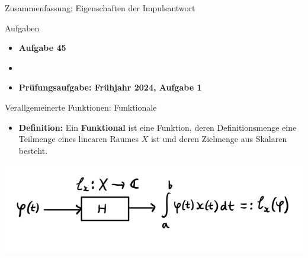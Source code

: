 \documentclass[14pt, aspectratio=169, handout]{beamer}
\begin{document}
\begin{frame}{Zusammenfassung: Eigenschaften der Impulsantwort}
\end{frame}

\begin{frame}{Aufgaben}
    \begin{itemize}
        \item \textbf{Aufgabe 45}
        \item[]
        \item \textbf{Prüfungsaufgabe: Frühjahr 2024, Aufgabe 1}
    \end{itemize}
\end{frame}

\begin{frame}{Verallgemeinerte Funktionen: Funktionale}
    \begin{itemize}
        \item \textbf{Definition:} Ein \textbf{Funktional} ist eine Funktion, deren Definitionsmenge eine Teilmenge eines linearen Raumes $X$ ist und deren Zielmenge aus Skalaren besteht.
    \end{itemize}
    \begin{center}
        \includegraphics[width=0.8\linewidth]{figures/Funktionale_2 copy.jpg}
    \end{center}
\end{frame}
\end{document}
